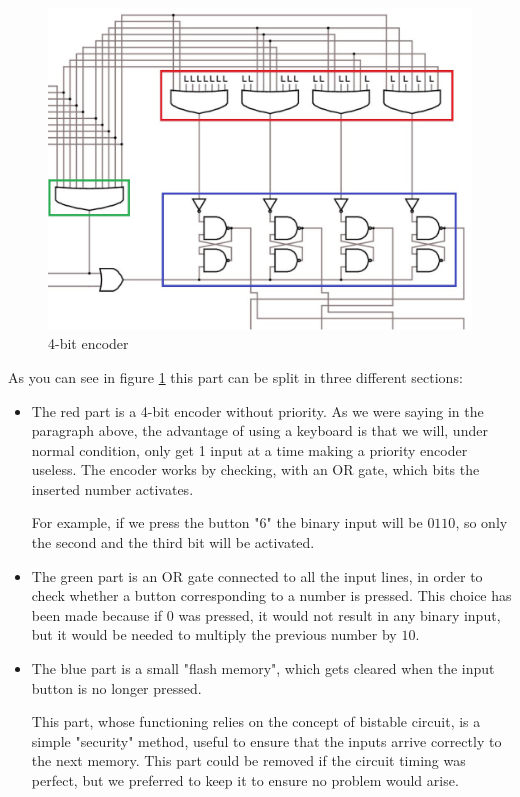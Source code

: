 \documentclass{article}
\begin{document}
\begin{figure}[h]
    \centering
    \includegraphics[scale=.35]{IM_4BitEncoder.JPG}
    \caption{4-bit encoder}
    \label{encoder}
\end{figure}

As you can see in figure \ref{encoder} this part can be split in three different sections:

\begin{itemize}
    \item The red part is a 4-bit encoder without priority. As we were saying in the paragraph above, the advantage of using a keyboard is that we will, under normal condition, only get 1 input at a time making a priority encoder useless. The encoder works by checking, with an OR gate, which bits the inserted number activates.
    
    \vspace{1mm}

    For example, if we press the button "6" the binary input will be $0110$, so only the second and the third bit will be activated.

    \item The green part is an OR gate connected to all the input lines, in order to check whether a button corresponding to a number is pressed. This choice has been made because if 0 was pressed, it would not result in any binary input, but it would be needed to multiply the previous number by $10$. 

    \item The blue part is a small "flash memory", which gets cleared when the input button is no longer pressed. 
            
        This part, whose functioning relies on the concept of bistable circuit, is a simple "security" method, useful to ensure that the inputs arrive correctly to the next memory. This part could be removed if the circuit timing was perfect, but we preferred to keep it to ensure no problem would arise.    
\end{itemize}
\end{document}
